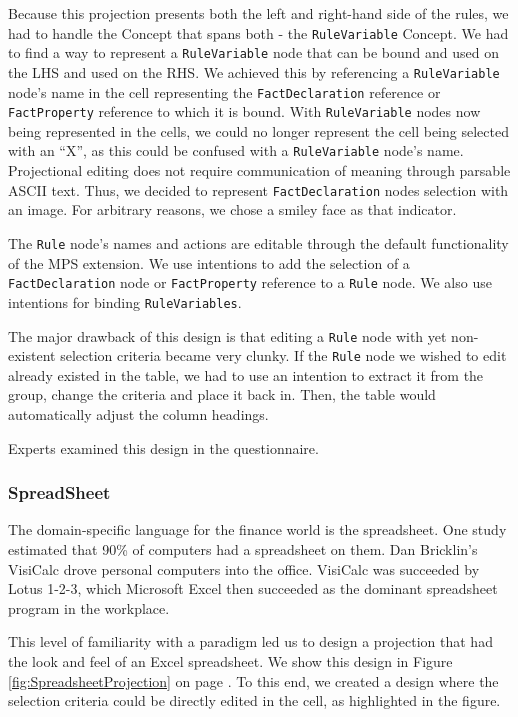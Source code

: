 Because this projection presents both the left and right-hand side of the rules, we had to handle the Concept that spans both - the \texttt{RuleVariable} Concept.
We had to find a way to represent a \texttt{RuleVariable} node that can be bound and used on the LHS and used on the RHS.
We achieved this by referencing a \texttt{RuleVariable} node's name in the cell representing the \texttt{FactDeclaration} reference or \texttt{FactProperty} reference to which it is bound.
With \texttt{RuleVariable} nodes now being represented in the cells, we could no longer represent the cell being selected with an ``X'', as this could be confused with a \texttt{RuleVariable} node's name.
Projectional editing does not require communication of meaning through parsable ASCII text.
Thus, we decided to represent \texttt{FactDeclaration} nodes selection with an image.
For arbitrary reasons, we chose a smiley face as that indicator.

The \texttt{Rule} node's names and actions are editable through the default functionality of the MPS extension.
We use intentions to add the selection of a \texttt{FactDeclaration} node or \texttt{FactProperty} reference to a \texttt{Rule} node.
We also use intentions for binding \texttt{RuleVariables}.

The major drawback of this design is that editing a \texttt{Rule} node with yet non-existent selection criteria became very clunky.
If the \texttt{Rule} node we wished to edit already existed in the table, we had to use an intention to extract it from the group, change the criteria and place it back in.
Then, the table would automatically adjust the column headings.

Experts examined this design in the questionnaire.

\subsubsection{SpreadSheet}

The domain-specific language for the finance world is the spreadsheet.
One study estimated that 90\% of computers had a spreadsheet on them\cite{bradley2009using}.
Dan Bricklin's VisiCalc drove personal computers into the office.
VisiCalc was succeeded by Lotus 1-2-3, which Microsoft Excel then succeeded as the dominant spreadsheet program in the workplace.

This level of familiarity with a paradigm led us to design a projection that had the look and feel of an Excel spreadsheet.
We show this design in Figure \ref{fig:SpreadsheetProjection} on page \pageref{fig:SpreadsheetProjection}.
To this end, we created a design where the selection criteria could be directly edited in the cell, as highlighted in the figure.


